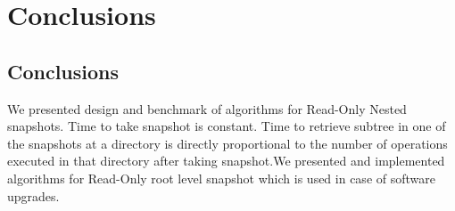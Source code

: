 
%
%
%


\chapter{Conclusions}
\label{ch:conclusion}


\section{Conclusions}
We presented design and benchmark of algorithms for Read-Only Nested snapshots. Time to take snapshot is constant. Time to retrieve subtree in one of the snapshots at a directory is directly proportional to the number of operations executed in that directory after taking snapshot.We presented and implemented algorithms for Read-Only root level snapshot which is used in case of software upgrades.
